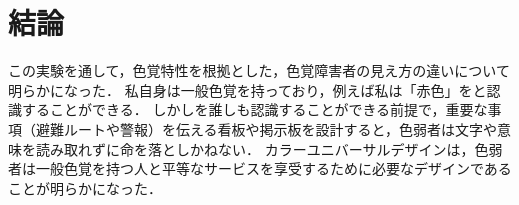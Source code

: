\section{結論}
この実験を通して，色覚特性を根拠とした，色覚障害者の見え方の違いについて明らかになった．
私自身は一般色覚を持っており，例えば私は「赤色」をと認識することができる．
しかしを誰しも認識することができる前提で，重要な事項（避難ルートや警報）を伝える看板や掲示板を設計すると，色弱者は文字や意味を読み取れずに命を落としかねない．
カラーユニバーサルデザインは，色弱者は一般色覚を持つ人と平等なサービスを享受するために必要なデザインであることが明らかになった．